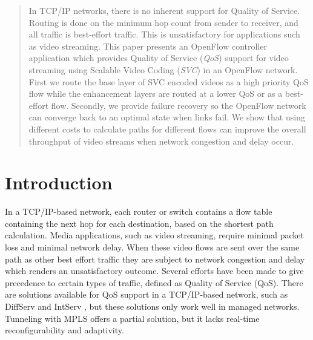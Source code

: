 \documentclass[conference]{IEEEtran}
\begin{document}
\begin{abstract}
In TCP/IP networks, there is no inherent support for Quality of Service.
Routing is done on the minimum hop count from sender to receiver, and all traffic is best-effort traffic. 
This is unsatisfactory for applications such as video streaming. 
This paper presents an OpenFlow controller application which provides 
Quality of Service (\textit{QoS}) support for video streaming using Scalable Video Coding (\textit{SVC}) in an OpenFlow network. 
First we route the base layer of SVC encoded videos as a 
high priority QoS flow while the enhancement layers are routed at a lower QoS or as a best-effort flow. 
Secondly, we provide failure recovery so the OpenFlow network can converge back to an optimal 
state when links fail. We show that using different costs to calculate paths for different flows 
can improve the overall throughput of video streams when network congestion and delay occur.
\end{abstract}





%
\IEEEpeerreviewmaketitle



\section{Introduction}
In a TCP/IP-based network, each router or switch contains a flow table containing the 
next hop for each destination, based on the shortest path calculation. 
Media applications, such as video streaming, 
require minimal packet loss and minimal network delay. 
When these video flows are sent over the same path as other best effort traffic they 
are subject to network congestion and delay which renders an unsatisfactory outcome. 
Several efforts have been made to give precedence to certain types of traffic, defined as Quality of Service (QoS).
There are solutions available for QoS support in a TCP/IP-based network, 
such as DiffServ \cite{diffserv} and IntServ \cite{intserv}, but these 
solutions only work well in managed networks.
Tunneling with MPLS offers a partial solution, but it lacks real-time reconfigurability and adaptivity. \cite{mpls}
\end{document}
